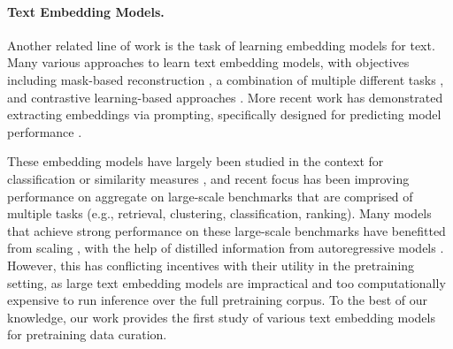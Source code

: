 \paragraph{Text Embedding Models.} Another related line of work is the task of learning embedding models for text. 
Many various approaches to learn text embedding models, with objectives including mask-based reconstruction \citep{devlin2018bert, liu2019roberta}, a combination of multiple different tasks \citep{cer2018universal}, and contrastive learning-based approaches \citep{gao2021simcse, neelakantan2022text, izacard2022unsupervised, lee2024gecko}.
More recent work has demonstrated extracting embeddings via prompting, specifically designed for predicting model performance \citep{sam2025predicting}.

These embedding models have largely been studied in the context for classification or similarity measures \citep{gomaa2013survey, agirre2013sem, agirre2016semeval}, and recent focus has been improving performance on aggregate on large-scale benchmarks \citep{muennighoff2022mteb} that are comprised of multiple tasks (e.g., retrieval, clustering, classification, ranking). 
Many models that achieve strong performance on these large-scale benchmarks have benefitted from scaling \citep{jiang2023scaling, chowdhery2023palm}, with the help of distilled information from autoregressive models \citep{lee2024gecko}. 
However, this has conflicting incentives with their utility in the pretraining setting, as large text embedding models are impractical and too computationally expensive to run inference over the full pretraining corpus. 
To the best of our knowledge, our work provides the first study of various text embedding models for pretraining data curation.